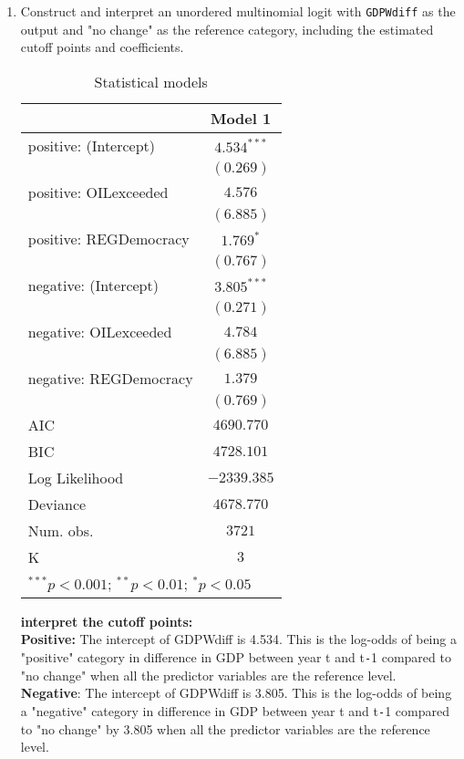 \documentclass[12pt,letterpaper]{article}
\begin{document}
\begin{enumerate}
	\item Construct and interpret an unordered multinomial logit with \texttt{GDPWdiff} as the output and "no change" as the reference category, including the estimated cutoff points and coefficients.
	
	\pagebreak
    \begin{table}[h]
    	\begin{center}\begin{tabular}{l c}\hline & Model 1 \\
    			\hline
    			positive: (Intercept)  & $4.534^{***}$ \\                       & $(0.269)$     \\positive: OILexceeded  & $4.576$       \\                       & $(6.885)$     \\positive: REGDemocracy & $1.769^{*}$   \\                       & $(0.767)$     \\negative: (Intercept)  & $3.805^{***}$ \\                       & $(0.271)$     \\negative: OILexceeded  & $4.784$       \\                       & $(6.885)$     \\negative: REGDemocracy & $1.379$       \\                       & $(0.769)$     \\
    			\hline
    			AIC                    & $4690.770$    \\BIC                    & $4728.101$    \\Log Likelihood         & $-2339.385$   \\Deviance               & $4678.770$    \\Num. obs.              & $3721$        \\K                      & $3$           \\\hline\multicolumn{2}{l}{\scriptsize{$^{***}p<0.001$; $^{**}p<0.01$; $^{*}p<0.05$}}\end{tabular}\caption{Statistical models}\label{table:coefficients}\end{center}\end{table}
    
	\noindent \textbf{interpret the cutoff points:}\\
	\textbf{Positive:} The intercept of GDPWdiff is 4.534. This is the log-odds of being a "positive" category in difference in GDP between year t and t\texttt{-}1 compared to "no change" when all the predictor variables are the reference level.\\
	\textbf{Negative}: The intercept of GDPWdiff is 3.805. This is the log-odds of being a "negative" category in difference in GDP between year t and t\texttt{-}1 compared to "no change" by 3.805 when all the predictor variables are the reference level.\\
	

\end{enumerate}
\end{document}
